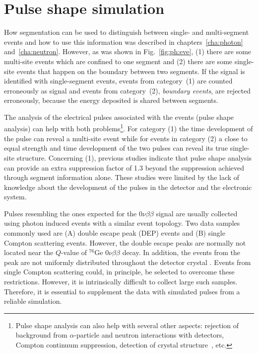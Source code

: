\chapter{Pulse shape simulation}
\label{cha:pss}
How segmentation can be used to distinguish between single- and
multi-segment events and how to use this information was described in
chapters~\ref{cha:photon} and~\ref{cha:neutron}.  However, as was
shown in Fig.~\ref{fig:ph:eve}, (1) there are some multi-site events
which are confined to one segment and (2) there are some single-site
events that happen on the boundary between two segments. If the
signal is identified with single-segment events, events from
category~(1) are counted erroneously as signal and events from
category~(2), \textit{boundary events}, are rejected erroneously,
because the energy deposited is shared between segments.

The analysis of the electrical pulses associated with the events
(pulse shape analysis) can help with both problems\footnote{Pulse
shape analysis can also help with several other aspects: rejection of
background from $\alpha$-particle and neutron interactions with
detectors, Compton continuum suppression\cite{comcon}, detection of
crystal structure~\cite{agata}, etc.}. For category (1) the time
development of the pulse can reveal a multi-site event while for
events in category (2) a close to equal strength and time development
of the two pulses can reveal its true single-site structure.
Concerning (1), previous studies \cite{Kev07} indicate that pulse
shape analysis can provide an extra suppression factor of 1.3 beyond
the suppression achieved through segment information alone. These
studies were limited by the lack of knowledge about the development of
the pulses in the detector and the electronic system.

Pulses resembling the ones expected for the $0\nu\beta\beta$ signal
are usually collected using photon induced events with a similar event
topology. Two data samples commonly used are (A) double escape peak
(DEP) events and (B) single Compton scattering
events\cite{scoms}. However, the double escape peaks are normally not
located near the $Q$-value of $^{76}$Ge $0\nu\beta\beta$ decay. In
addition, the events from the peak are not uniformly distributed
throughout the detector crystal \cite{major}.  Events from single
Compton scattering could, in principle, be selected to overcome these
restrictions. However, it is intrinsically difficult to collect large
such samples. Therefore, it is essential to supplement the data with
simulated pulses from a reliable simulation.

